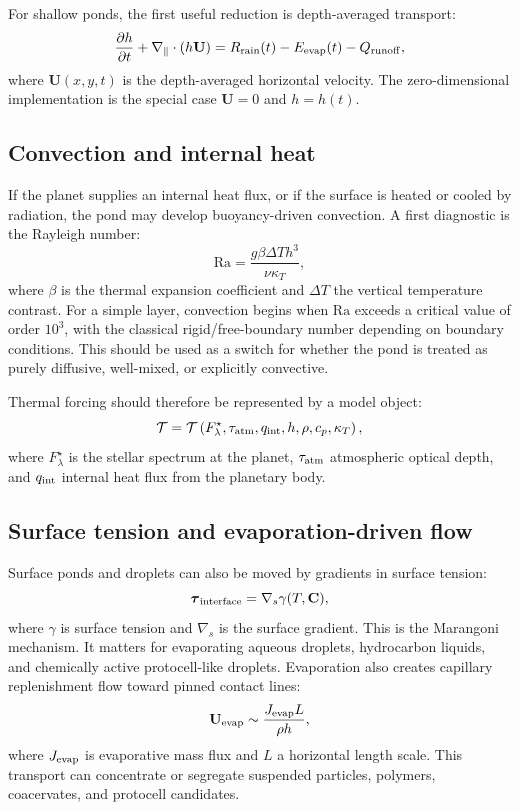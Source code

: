 \documentclass[11pt]{article}
\begin{document}
For shallow ponds, the first useful reduction is depth-averaged transport:
\begin{equation}
\frac{\partial h}{\partial t}
+
\nabla_{\parallel}\cdot(h\mathbf{U})
=
R_{\rm rain}(t)-E_{\rm evap}(t)-Q_{\rm runoff},
\end{equation}
where $\mathbf{U}(x,y,t)$ is the depth-averaged horizontal velocity. The
zero-dimensional implementation is the special case $\mathbf{U}=0$ and
$h=h(t)$.

\subsection{Convection and internal heat}

If the planet supplies an internal heat flux, or if the surface is heated or
cooled by radiation, the pond may develop buoyancy-driven convection. A first
diagnostic is the Rayleigh number:
\begin{equation}
\mathrm{Ra}
=
\frac{g\beta\Delta T h^3}{\nu\kappa_T},
\end{equation}
where $\beta$ is the thermal expansion coefficient and $\Delta T$ the vertical
temperature contrast. For a simple layer, convection begins when
$\mathrm{Ra}$ exceeds a critical value of order $10^3$, with the classical
rigid/free-boundary number depending on boundary conditions. This should be
used as a switch for whether the pond is treated as purely diffusive,
well-mixed, or explicitly convective.

Thermal forcing should therefore be represented by a model object:
\begin{equation}
\mathcal{T}
=
\mathcal{T}
\left(
F_{\lambda}^{\star},
\tau_{\rm atm},
q_{\rm int},
h,
\rho,
c_p,
\kappa_T
\right),
\end{equation}
where $F_{\lambda}^{\star}$ is the stellar spectrum at the planet,
$\tau_{\rm atm}$ atmospheric optical depth, and $q_{\rm int}$ internal heat
flux from the planetary body.

\subsection{Surface tension and evaporation-driven flow}

Surface ponds and droplets can also be moved by gradients in surface tension:
\begin{equation}
\boldsymbol{\tau}_{\rm interface}
=
\nabla_s \gamma(T,\mathbf{C}),
\end{equation}
where $\gamma$ is surface tension and $\nabla_s$ is the surface gradient.
This is the Marangoni mechanism. It matters for evaporating aqueous droplets,
hydrocarbon liquids, and chemically active protocell-like droplets. Evaporation
also creates capillary replenishment flow toward pinned contact lines:
\begin{equation}
\mathbf{U}_{\rm evap}
\sim
\frac{J_{\rm evap} L}{\rho h},
\end{equation}
where $J_{\rm evap}$ is evaporative mass flux and $L$ a horizontal length
scale. This transport can concentrate or segregate suspended particles,
polymers, coacervates, and protocell candidates.
\end{document}
